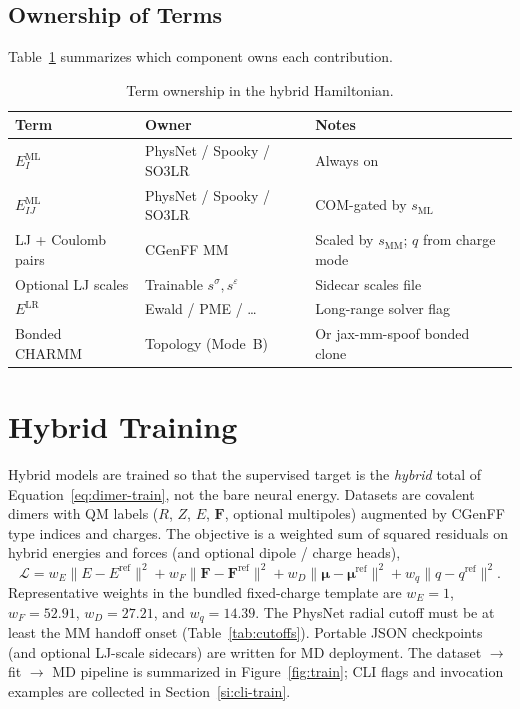 \documentclass[journal=jctc,manuscript=article]{achemso}
\begin{document}
\subsection{Ownership of Terms}

Table~\ref{tab:ownership} summarizes which component owns each contribution.

\begin{table}[h]
\caption{Term ownership in the hybrid Hamiltonian.}
\label{tab:ownership}
\begin{tabular}{llp{4.8cm}}
\toprule
Term & Owner & Notes \\
\midrule
\(E_I^{\mathrm{ML}}\) & PhysNet / Spooky / SO3LR\cite{Unke2019PhysNet,Unke2021SpookyNet,Kabylda2025SO3LR} & Always on \\
\(E_{IJ}^{\mathrm{ML}}\) & PhysNet / Spooky / SO3LR & COM-gated by \(s_{\mathrm{ML}}\) \\
LJ + Coulomb pairs & CGenFF MM & Scaled by \(s_{\mathrm{MM}}\); \(q\) from charge mode \\
Optional LJ scales & Trainable \(s^\sigma,s^\varepsilon\) & Sidecar scales file \\
\(E^{\mathrm{LR}}\) & Ewald / PME / \ldots & Long-range solver flag \\
Bonded CHARMM & Topology (Mode~B) & Or jax-mm-spoof bonded clone \\
\bottomrule
\end{tabular}
\end{table}

\section{Hybrid Training}
\label{sec:train}

Hybrid models are trained so that the supervised target is the \emph{hybrid}
total of Equation~\ref{eq:dimer-train}, not the bare neural energy. Datasets
are covalent dimers with QM labels
(\(R\), \(Z\), \(E\), \(\mathbf{F}\), optional multipoles)\cite{Kohn1965,Sun2018PySCF,Moller1934,KohnShamDFTReview}
augmented by CGenFF type indices and charges. The objective is a weighted sum
of squared residuals on hybrid energies and forces (and optional dipole /
charge heads),
\begin{equation}
\label{eq:loss}
\mathcal{L}
  = w_E\|E-E^{\mathrm{ref}}\|^2
  + w_F\|\mathbf{F}-\mathbf{F}^{\mathrm{ref}}\|^2
  + w_D\|\boldsymbol{\mu}-\boldsymbol{\mu}^{\mathrm{ref}}\|^2
  + w_q\|q-q^{\mathrm{ref}}\|^2.
\end{equation}
Representative weights in the bundled fixed-charge template are
\(w_E=1\), \(w_F=52.91\), \(w_D=27.21\), and \(w_q=14.39\). The PhysNet radial
cutoff must be at least the MM handoff onset (Table~\ref{tab:cutoffs}).
Portable JSON checkpoints (and optional LJ-scale sidecars) are written for MD
deployment. The dataset \(\to\) fit \(\to\) MD pipeline is summarized in
Figure~\ref{fig:train}; CLI flags and invocation examples are collected in
Section~\ref{si:cli-train}.
\end{document}
